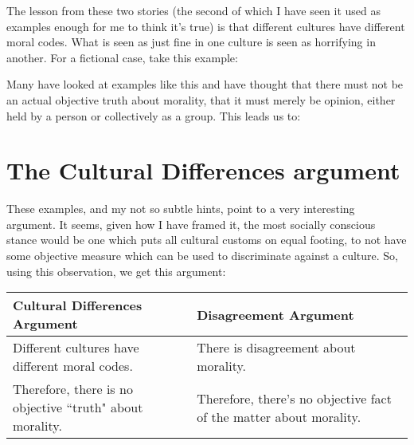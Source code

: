 The lesson from these two stories (the second of which I have seen it used as examples enough for me to think it's true) is that different cultures have different moral codes. What is seen as just fine in one culture is seen as horrifying in another. For a fictional case, take this example:


Many have looked at examples like this and have thought that there must not be an actual objective truth about morality, that it must merely be opinion, either held by a person or collectively as a group. This leads us to:

\section{The Cultural Differences argument}

These examples, and my not so subtle  hints, point to a very interesting argument. It seems, given how I have framed it, the most socially conscious stance would be one which puts all cultural customs on equal footing, to not have some objective measure which can be used to discriminate against a culture. So, using this observation, we get this argument:
\noindent
\begin{tabular}{p{2.75in}|p{2.75in}}
Cultural Differences Argument&Disagreement Argument\\\hline
    Different cultures have different moral codes.&There is disagreement about morality.\\
    Therefore, there is no objective ``truth" about morality.&Therefore, there's no objective fact of the matter about morality.
\end{tabular}

